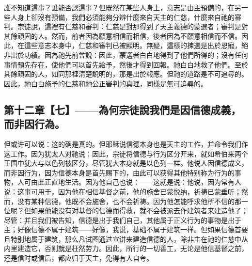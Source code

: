 誰不知道這事？誰能否認這事？但既然在某些人身上，意志是由主預備的，在另一些人身上卻沒有預備，我們必須能夠分辨什麼來自天主的仁慈，什麼來自祂的審判。宗徒說，這裡有仁慈和審判：仁慈是對那得到了天主義德的蒙選者；審判是對其餘頑固的人。然而，前者因為願意相信而相信，後者因為不願意相信而不信。因此，在這些意志本身中，仁慈和審判已被顯明。無疑，這樣的揀選是出於恩寵，絕非出於功績。因為祂先前曾說：因此，蒙選者白白地得到了他們所得的；沒有任何事情預先存在，使他們可以首先給予，然後才得到回報。祂白白地救了他們。至於其餘頑固的人，如同那裡清楚說明的，那是出於報應。但祂的道路是不可追尋的。因此，祂白白施予的仁慈和祂公正審判的真理，同樣是無可追尋的。\par


\subsection{第十二章【七】——為何宗徒說我們是因信德成義，而非因行為。}

但或许可以说：这的确是真的。但耶稣说信德本身也是天主的工作，并命令我们作这工作。因为犹太人对祂说：因此，宗徒将信德与行为区分开来，就如希伯来两个王国中犹大与以色列被区分，尽管犹大本身就是以色列一样。他说人因信德成义，而非因行为，因为信德本身是首先赐下的，由此可以获得其他特别称为行为的事物，人可由此正直地生活。因为他自己也说：——这就是说：他说，因为常有人说：这事可用于，因为他在相信基督之前，他的施舍已蒙悦纳，祈祷已蒙垂听；然而，没有某种信德，他既不会施舍，也不会祈祷。因为他怎能呼求他所不信的那一位呢？但如果他能没有对基督的信德而得救，就不会被派去作建筑者来建造他了；尽管：并且我们被告知，信德是出于我们自己，其他属于正义行为的事物是出于主；好像信德不属于建筑——好像，我说，基础不属于建筑一样。但如果信德首要且特别地属于建筑，那么凡试图通过宣讲来建造信德的人，除非主在祂的仁慈中从内里建造它，否则就是枉然劳力。因此，所行的一切善工，无论是他信基督之前，还是信时或信后，都应归于天主，免得有人自夸。\par

